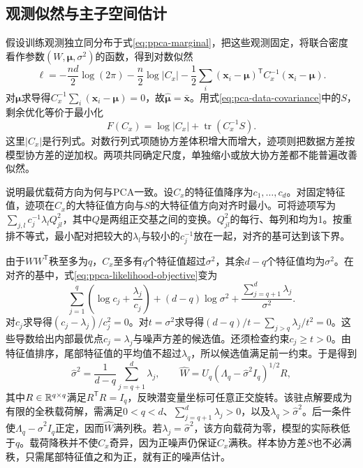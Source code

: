 \subsection{观测似然与主子空间估计}
假设训练观测独立同分布于式\eqref{eq:ppca-marginal}，把这些观测固定，将联合密度看作参数$(W,\bm\mu,\sigma^2)$的函数，得到对数似然
\begin{equation}
 \ell=-\frac{nd}{2}\log(2\pi)-\frac n2\log|C_x|
 -\frac12\sum_i(\bm x_i-\bm\mu)^{\mathsf T}C_x^{-1}(\bm x_i-\bm\mu).
\end{equation}
对$\bm\mu$求导得$C_x^{-1}\sum_i(\bm x_i-\bm\mu)=0$，故$\hat{\bm\mu}=\bar{\bm x}$。用式\eqref{eq:pca-data-covariance}中的$S$，剩余优化等价于最小化
\begin{equation}
 F(C_x)=\log|C_x|+\operatorname{tr}(C_x^{-1}S).
 \label{eq:ppca-likelihood-objective}
\end{equation}
这里$|C_x|$是行列式。对数行列式项随协方差体积增大而增大，迹项则把数据方差按模型协方差的逆加权。两项共同确定尺度，单独缩小或放大协方差都不能普遍改善似然。

说明最优载荷方向为何与PCA一致。设$C_x$的特征值降序为$c_1,\ldots,c_d$。对固定特征值，迹项在$C_x$的大特征值方向与$S$的大特征值方向对齐时最小。可将迹项写为$\sum_{j,l}c_j^{-1}\lambda_l Q_{jl}^2$，其中$Q$是两组正交基之间的变换。$Q_{jl}^2$的每行、每列和均为1。按重排不等式，最小配对把较大的$\lambda_l$与较小的$c_j^{-1}$放在一起，对齐的基可达到该下界。

由于$WW^{\mathsf T}$秩至多为$q$，$C_x$至多有$q$个特征值超过$\sigma^2$，其余$d-q$个特征值均为$\sigma^2$。在对齐的基中，式\eqref{eq:ppca-likelihood-objective}变为
\begin{equation}
 \sum_{j=1}^q\left(\log c_j+\frac{\lambda_j}{c_j}\right)
 +(d-q)\log\sigma^2+\frac{\sum_{j=q+1}^d\lambda_j}{\sigma^2}.
\end{equation}
对$c_j$求导得$(c_j-\lambda_j)/c_j^2=0$。对$t=\sigma^2$求导得$(d-q)/t-\sum_{j>q}\lambda_j/t^2=0$。这些导数给出内部最优点$c_j=\lambda_j$与噪声方差的候选值。还须检查约束$c_j\ge t>0$。由特征值排序，尾部特征值的平均值不超过$\lambda_q$，所以候选值满足前一约束。于是得到
\begin{equation}
 \hat\sigma^2=\frac1{d-q}\sum_{j=q+1}^d\lambda_j,\qquad
 \hat W=U_q(\Lambda_q-\hat\sigma^2I_q)^{1/2}R,
 \label{eq:ppca-ml-solution}
\end{equation}
其中$R\in\mathbb{R}^{q\times q}$满足$R^{\mathsf T}R=I_q$，反映潜变量坐标可任意正交旋转。该驻点解要成为有限的全秩载荷解，需满足$0<q<d$、$\sum_{j=q+1}^d\lambda_j>0$，以及$\lambda_q>\hat\sigma^2$。后一条件使$\Lambda_q-\hat\sigma^2I_q$正定，因而$\hat W$满列秩。若$\lambda_j=\hat\sigma^2$，该方向载荷为零，模型的实际秩低于$q$。载荷降秩并不使$C_x$奇异，因为正噪声仍保证$C_x$满秩。样本协方差$S$也不必满秩，只需尾部特征值之和为正，就有正的噪声估计。

